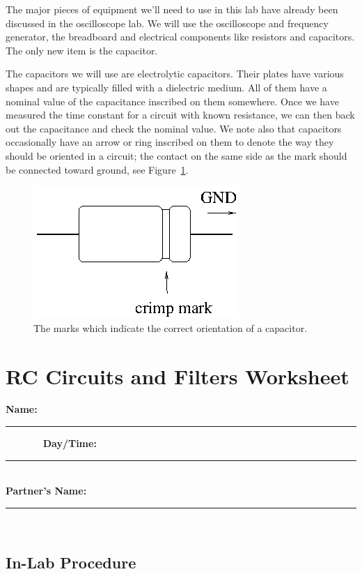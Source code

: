 The major pieces of equipment we'll need to use in this lab have already been 
discussed in the oscilloscope lab. We will use the oscilloscope and frequency
generator, the breadboard and electrical components like resistors and 
capacitors. The only new item is the capacitor.

The capacitors we will use are electrolytic capacitors. Their plates have 
various shapes and are typically filled with a dielectric medium.
All of them have a nominal value of the capacitance inscribed on them somewhere.
Once we have measured the
time constant for a circuit with known resistance, we can then back out the 
capacitance and check the nominal value.  We note also that capacitors 
occasionally have an arrow or ring inscribed on them to denote the way they 
should be oriented in a circuit; the contact on the same side as the mark 
should be connected toward ground, see Figure~\ref{fig:rc:capacitor}.  
\begin{figure}[htb]
\centering 
\epsfxsize=9cm \includegraphics[scale=0.5]{5_rccircuits/capacitor.eps}
\caption{The marks which indicate the correct orientation of a capacitor.}
\label{fig:rc:capacitor}
\end{figure}

\clearpage

\renewcommand{\thesection}{\thechapter.W}

\section{RC Circuits and Filters Worksheet}
{\bf \Large Name:}~ \rule{5cm}{.1mm}~~~~~~~
{\bf \Large Day/Time:}~\rule{3cm}{.1mm}\\
{\bf \Large Partner's Name:}~\rule{6cm}{.1mm}\\
 \subsection{In-Lab Procedure}

